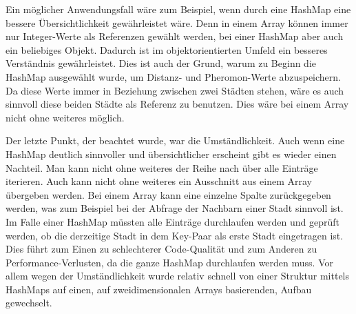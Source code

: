 Ein möglicher Anwendungsfall wäre zum Beispiel, wenn durch eine HashMap eine bessere Übersichtlichkeit gewährleistet wäre. Denn in einem Array können immer nur Integer-Werte als Referenzen gewählt werden, bei einer HashMap aber auch ein beliebiges Objekt. Dadurch ist im objektorientierten Umfeld ein besseres Verständnis gewährleistet. Dies ist auch der Grund, warum zu Beginn die HashMap ausgewählt wurde, um Distanz- und Pheromon-Werte abzuspeichern. Da diese Werte immer in Beziehung zwischen zwei Städten stehen, wäre es auch sinnvoll diese beiden Städte als Referenz zu benutzen. Dies wäre bei einem Array nicht ohne weiteres möglich.

Der letzte Punkt, der beachtet wurde, war die Umständlichkeit. Auch wenn eine HashMap deutlich sinnvoller und übersichtlicher erscheint gibt es wieder einen Nachteil. Man kann nicht ohne weiteres der Reihe nach über alle Einträge iterieren. Auch kann nicht ohne weiteres ein Ausschnitt aus einem Array übergeben werden. Bei einem Array kann eine einzelne Spalte zurückgegeben werden, was zum Beispiel bei der Abfrage der Nachbarn einer Stadt sinnvoll ist. Im Falle einer HashMap müssten alle Einträge durchlaufen werden und geprüft werden, ob die derzeitige Stadt in dem Key-Paar als erste Stadt eingetragen ist.
Dies führt zum Einen zu schlechterer Code-Qualität und zum Anderen zu Performance-Verlusten, da die ganze HashMap durchlaufen werden muss. Vor allem wegen der Umständlichkeit wurde relativ schnell von einer Struktur mittels HashMaps auf einen, auf zweidimensionalen Arrays basierenden, Aufbau gewechselt.


